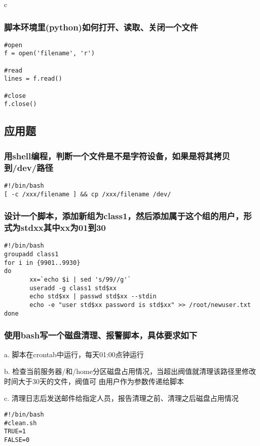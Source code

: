 \documentclass{article}
\begin{document}
\begin{mitned}{c}
\subsubsection{脚本环境里(python)如何打开、读取、关闭一个文件}
\begin{verbatim}
#open
f = open('filename', 'r')

#read
lines = f.read()

#close
f.close()

\end{verbatim}

\subsection{应用题}

\subsubsection{用shell编程，判断一个文件是不是字符设备，如果是将其拷贝到/dev/路径}
\begin{verbatim}
#!/bin/bash
[ -c /xxx/filename ] && cp /xxx/filename /dev/
\end{verbatim}

\subsubsection{设计一个脚本，添加新组为class1，然后添加属于这个组的用户，形式为stdxx其中xx为01到30
 }
\begin{verbatim}
#!/bin/bash
groupadd class1
for i in {9901..9930}
do
       xx=`echo $i | sed 's/99//g'`
       useradd -g class1 std$xx
       echo std$xx | passwd std$xx --stdin
       echo -e "user std$xx password is std$xx" >> /root/newuser.txt
done

\end{verbatim}

\subsubsection{使用bash写一个磁盘清理、报警脚本，具体要求如下}
a. 脚本在crontab中运行，每天01:00点钟运行


b. 检查当前服务器/和/home分区磁盘占用情况，当超出阀值就清理该路径里修改时间大于30天的文件，阀值可
由用户作为参数传递给脚本


c. 清理日志后发送邮件给指定人员，报告清理之前、清理之后磁盘占用情况

\begin{verbatim}
#!/bin/bash
#clean.sh
TRUE=1
FALSE=0


\end{verbatim}
\end{mitned}
\end{document}
